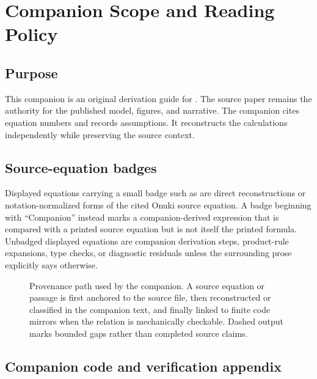 \section{Companion Scope and Reading Policy}
\label{sec:companion-scope}


\subsection*{Purpose}

This companion is an original derivation guide for \OnukiPRE. The source
paper remains the authority for the published model, figures, and narrative.
The companion cites equation numbers and records assumptions. It reconstructs the calculations independently while preserving the source context.

\subsection*{Source-equation badges}

Displayed equations carrying a small badge such as 
are direct reconstructions or notation-normalized forms of the cited Onuki
source equation.  A badge beginning with ``Companion'' instead marks a
companion-derived expression that is compared with a printed source equation
but is not itself the printed formula.  Unbadged displayed
equations are companion derivation steps, product-rule expansions, type checks,
or diagnostic residuals unless the surrounding prose explicitly says otherwise.


\begin{figure}[htbp]
\centering
\resizebox{0.96\linewidth}{!}{}
\caption{Provenance path used by the companion.  A source equation or passage is
first anchored to the source file, then reconstructed or classified in the
companion text, and finally linked to finite code mirrors when the relation is
mechanically checkable.  Dashed output marks bounded gaps rather than completed
source claims.}
\label{fig:source-to-companion-provenance-map}
\end{figure}


\subsection*{Companion code and verification appendix}

